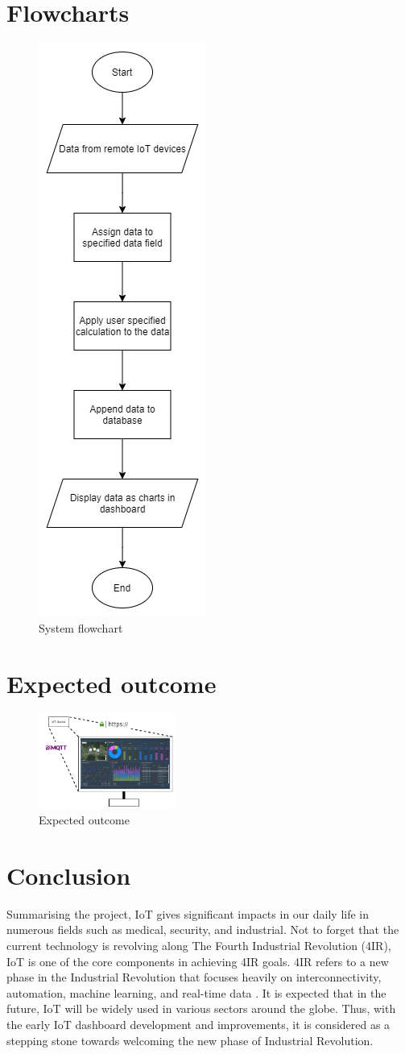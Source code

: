 \documentclass[conference]{IEEEtran}
\begin{document}
\section{Flowcharts}


\begin{figure}[h]
    \centering
    \includegraphics[height=0.45\textwidth]{flow}
    \caption{System flowchart}
    \label{fig:flow}
\end{figure}

\FloatBarrier

\section{Expected outcome}
\begin{figure}[h]
    \includegraphics[width=0.4\textwidth]{outcome}
    \caption{Expected outcome}
    \label{fig:outcome}
\end{figure}

\section{Conclusion}
Summarising the project, IoT gives significant impacts in our daily life in numerous fields 
such as medical, security, and industrial. Not to forget that the current technology is 
revolving along The Fourth Industrial Revolution (4IR), IoT is one of the core components 
in achieving 4IR goals. 4IR refers to a new phase in the Industrial Revolution that focuses 
heavily on interconnectivity, automation, machine learning, and real-time data \cite{b4}. It is 
expected that in the future, IoT will be widely used in various sectors around the globe. 
Thus, with the early IoT dashboard development and improvements, it is considered as a 
stepping stone towards welcoming the new phase of Industrial Revolution.
\end{document}
